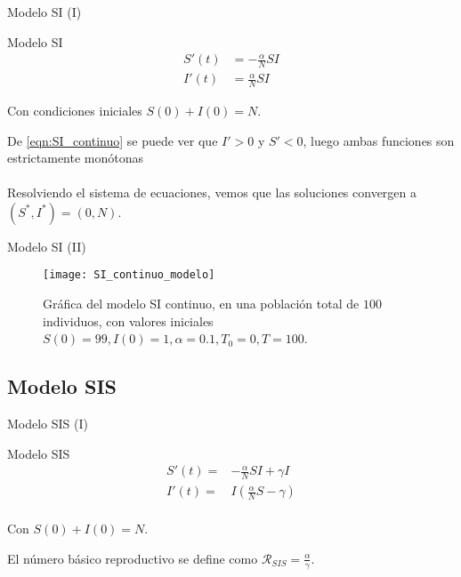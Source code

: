 \begin{frame}{Modelo SI (I)}

    \begin{block}{Modelo SI}
        \begin{equation}
            \label{eqn:SI_continuo}
            \begin{aligned}
            S'(t) & = -\frac{\alpha}{N}SI \\
            I'(t) & = \frac{\alpha}{N}SI
            \end{aligned}
        \end{equation}
            
        Con condiciones iniciales $S(0)+I(0)=N$.
    \end{block}
    
    \pause
    De \eqref{eqn:SI_continuo} se puede ver que $I'>0$ y $S'<0$, luego ambas funciones son estrictamente monótonas
    \\~\\

    \pause
    Resolviendo el sistema de ecuaciones, vemos que las soluciones convergen a $(S^*,I^*)=(0,N)$.
\end{frame}


\begin{frame}{Modelo SI (II)}

    \begin{figure}
    \begin{center}
    \caption{Gráfica del modelo SI continuo, en una población total de $100$ individuos, con valores iniciales $S(0)=99, I(0) = 1, \alpha = 0.1,T_0 = 0, T = 100$.}
    \label{fig: SI_continuo}
    \texttt{[image: SI\_continuo\_modelo]}
    \end{center}
    \end{figure}

\end{frame}


\subsection{Modelo SIS}


\begin{frame}{Modelo SIS (I)}
    \begin{block}{Modelo SIS}
    \begin{equation}
        \label{eqn: modelo_SIS_continuo}
        \begin{aligned}
        S'(t) = & -\frac{\alpha}{N}SI+\gamma I \\
        I'(t) = & I\left( \frac{\alpha}{N}S-\gamma \right) \\
        \end{aligned}
        \end{equation}
    
        Con $S(0)+I(0)=N$. 
    \end{block}
    
    \pause
    El número básico reproductivo se define como $\mathcal{R}_{SIS}=\frac{\alpha}{\gamma}$.
        
\end{frame}



